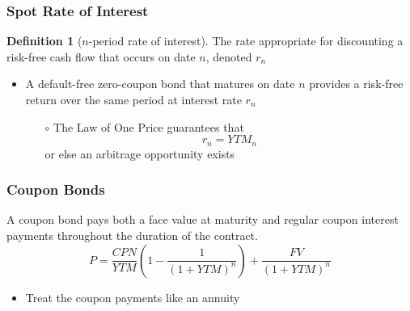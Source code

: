\documentclass[11pt]{article}
\theoremstyle{definition}
\newtheorem*{definition}{Definition}
\begin{document}
\subsubsection{Spot Rate of Interest}
\begin{definition}[$n$-period rate of interest]
    The rate appropriate for discounting a risk-free cash flow that occurs on date $n$, denoted $r_n$
\end{definition}
\begin{itemize}
    \item A default-free zero-coupon bond that matures on date $n$ provides a risk-free return over the same period at interest rate $r_n$
    \begin{itemize}
        \item[$\circ$] The Law of One Price guarantees that 
        \begin{equation*}
            r_n  = YTM_n
        \end{equation*}
        or else an arbitrage opportunity exists
    \end{itemize}
\end{itemize}

\subsubsection{Coupon Bonds}
A coupon bond pays both a face value at maturity and regular coupon interest payments throughout the duration of the contract.
\begin{equation*}
    P = \frac{CPN}{YTM}\left(1 - \frac{1}{(1 + YTM)^n}\right) + \frac{FV}{(1 + YTM)^n}
\end{equation*}
\begin{itemize}
    \item Treat the coupon payments like an annuity 
\end{itemize}
\end{document}
